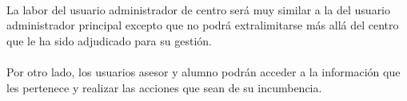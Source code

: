 \paragraph{}La labor del usuario administrador de centro será muy similar a la
del usuario administrador principal excepto que no podrá extralimitarse más
allá del centro que le ha sido adjudicado para su gestión.

\paragraph{}Por otro lado, los usuarios asesor y alumno podrán acceder a la
información que les pertenece y realizar las acciones que sean de su
incumbencia.
